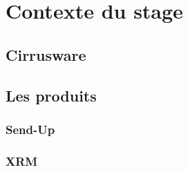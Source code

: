 \section{Contexte du stage}
\subsection{Cirrusware}



\subsection{Les produits}
\subsubsection{Send-Up}
\subsubsection{XRM}

